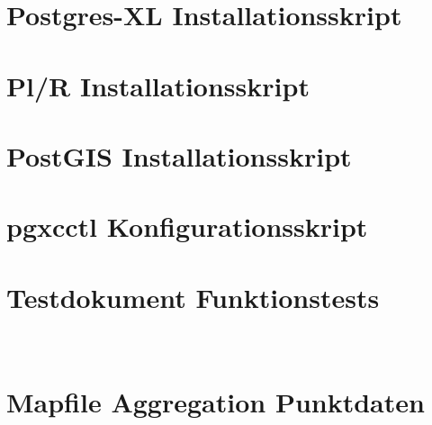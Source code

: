 \section{Postgres-XL Installationsskript}
	
\newpage
\section{Pl/R Installationsskript}

\newpage
\section{PostGIS Installationsskript}

\newpage
\section{pgxcctl Konfigurationsskript}

\newpage
\section{Testdokument Funktionstests}

\newpage
\ 
\newpage
\section{Mapfile Aggregation Punktdaten}

												

\pagestyle{empty}


